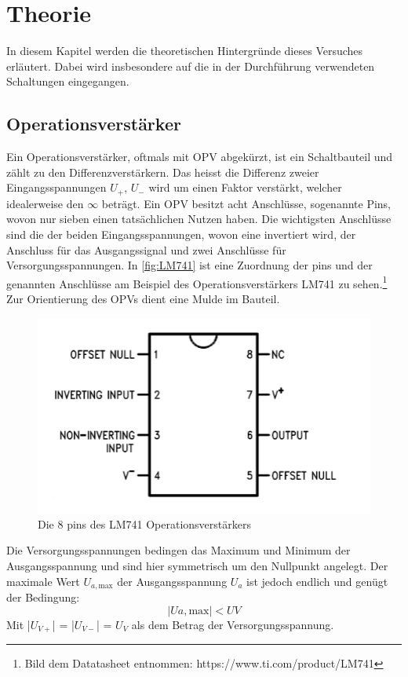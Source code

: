 \section{Theorie} 
\label{sec:Theorie}

In diesem Kapitel werden die theoretischen Hintergründe dieses Versuches erläutert. Dabei wird insbesondere auf die in der Durchführung verwendeten Schaltungen eingegangen.

\subsection{Operationsverstärker}\label{thopv}

Ein Operationsverstärker, oftmals mit OPV abgekürzt, ist ein Schaltbauteil und zählt zu den Differenzverstärkern.
Das heisst die Differenz zweier Eingangsspannungen $U_+$, $U_-$ wird um einen Faktor verstärkt, welcher idealerweise den $\infty$ beträgt.
Ein OPV besitzt acht Anschlüsse, sogenannte Pins, wovon nur sieben einen tatsächlichen Nutzen haben. 
Die wichtigsten Anschlüsse sind die der beiden Eingangsspannungen, wovon eine invertiert wird, der Anschluss für das Ausgangssignal und zwei Anschlüsse für Versorgungsspannungen.
In \autoref{fig:LM741} ist eine Zuordnung der pins und der genannten Anschlüsse am Beispiel des Operationsverstärkers LM741 zu sehen.\footnote{Bild dem Datatasheet entnommen: https://www.ti.com/product/LM741} 
Zur Orientierung des OPVs dient eine Mulde im Bauteil. 
\begin{figure}
    \centering
    \includegraphics[width=1\textwidth]{content/grafiken/LM741.png}
    \caption{Die 8 pins des LM741 Operationsverstärkers}
    \label{fig:LM741}
\end{figure}
Die Versorgungsspannungen bedingen das Maximum und Minimum der Ausgangsspannung und sind hier symmetrisch um den Nullpunkt angelegt. 
Der maximale Wert $U_{a,\text{max}}$ der Ausgangsspannung $U_a$ ist jedoch endlich und genügt der Bedingung:
\begin{equation} 
|U{a,\text{max}}| < U{V} 
\end{equation} 
Mit |$U_{V+}$| = |$U_{V-}$| = $U_V$ als dem Betrag der Versorgungsspannung.\\


